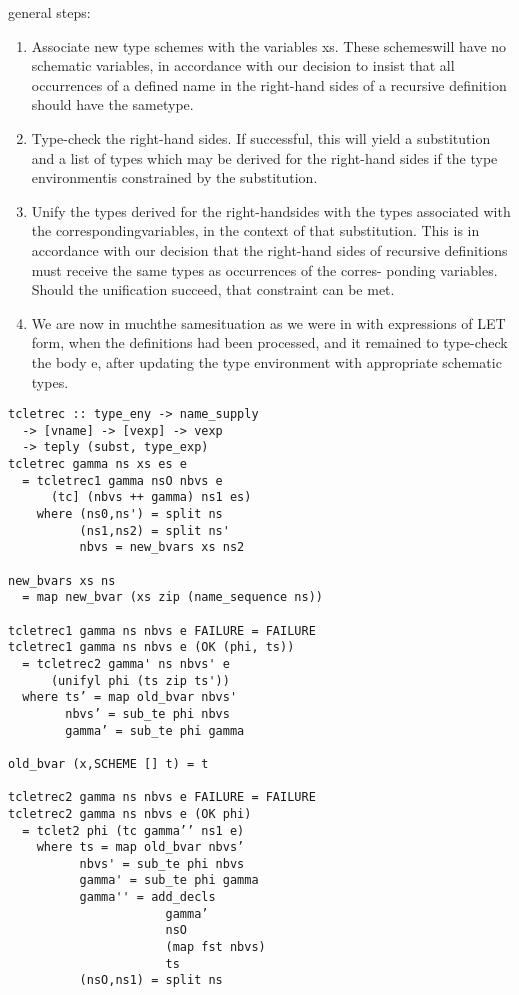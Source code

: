 \documentclass[8pt]{extarticle}
\begin{document}
\begin{multicols*}{2}
general steps:
\begin{enumerate}
\item Associate new type schemes with the variables xs. These schemeswill
have no schematic variables, in accordance with our decision to insist
that all occurrences of a defined name in the right-hand sides of a
recursive definition should have the sametype.
\item Type-check the right-hand sides. If successful, this will yield a
substitution and a list of types which may be derived for the right-hand
sides if the type environmentis constrained by the substitution.
\item Unify the types derived for the right-handsides with the types associated
with the correspondingvariables, in the context of that substitution. This
is in accordance with our decision that the right-hand sides of recursive
definitions must receive the same types as occurrences of the corres-
ponding variables. Should the unification succeed, that constraint can be
met.
\item We are now in muchthe samesituation as we were in with expressions of
LET form, when the definitions had been processed, and it remained to
type-check the body e, after updating the type environment with
appropriate schematic types.
\end{enumerate}

\begin{verbatim}
tcletrec :: type_eny -> name_supply
  -> [vname] -> [vexp] -> vexp
  -> teply (subst, type_exp)
tcletrec gamma ns xs es e
  = tcletrec1 gamma nsO nbvs e
      (tc] (nbvs ++ gamma) ns1 es)
    where (ns0,ns') = split ns
          (ns1,ns2) = split ns'
          nbvs = new_bvars xs ns2

new_bvars xs ns 
  = map new_bvar (xs zip (name_sequence ns))

tcletrec1 gamma ns nbvs e FAILURE = FAILURE
tcletrec1 gamma ns nbvs e (OK (phi, ts))
  = tcletrec2 gamma' ns nbvs' e
      (unifyl phi (ts zip ts'))
  where ts’ = map old_bvar nbvs'
        nbvs’ = sub_te phi nbvs
        gamma’ = sub_te phi gamma

old_bvar (x,SCHEME [] t) = t

tcletrec2 gamma ns nbvs e FAILURE = FAILURE
tcletrec2 gamma ns nbvs e (OK phi)
  = tclet2 phi (tc gamma’’ ns1 e)
    where ts = map old_bvar nbvs’
          nbvs' = sub_te phi nbvs
          gamma' = sub_te phi gamma
          gamma'' = add_decls
                      gamma’
                      nsO
                      (map fst nbvs)
                      ts
          (nsO,ns1) = split ns
\end{verbatim}


\end{multicols*}
\end{document}
